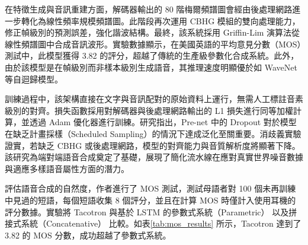 在特徵生成與音訊重建方面，解碼器輸出的 80 階梅爾頻譜圖會經由後處理網路進一步轉化為線性頻率規模頻譜圖。此階段再次運用 CBHG 模組的雙向處理能力，修正幀級別的預測誤差，強化諧波結構。最終，該系統採用 Griffin-Lim 演算法從線性頻譜圖中合成音訊波形。實驗數據顯示，在美國英語的平均意見分數（MOS）測試中，此模型獲得 3.82 的評分，超越了傳統的生產級參數化合成系統。此外，由於該模型是在幀級別而非樣本級別生成語音，其推理速度明顯優於如 WaveNet 等自迴歸模型。

訓練過程中，該架構直接在文字與音訊配對的原始資料上運行，無需人工標註音素級別的對齊。損失函數採用對解碼器與後處理網路輸出的 L1 損失進行同等加權計算，並透過 Adam 優化器進行訓練。研究指出，Pre-net 中的 Dropout 對於模型在缺乏計畫採樣（Scheduled Sampling）的情況下達成泛化至關重要。消歧義實驗證實，若缺乏 CBHG 或後處理網路，模型的對齊能力與音質解析度將顯著下降。該研究為端對端語音合成奠定了基礎，展現了簡化流水線在應對真實世界噪音數據與適應多樣語音屬性方面的潛力。

評估語音合成的自然度，作者進行了 MOS 測試，測試母語者對 100 個未再訓練中見過的短語，每個短語收集 8 個評分，並且在計算 MOS 時僅計入使用耳機的評分數據。實驗將 Tacotron 與基於 LSTM 的參數式系統（Parametric）\cite{zen2016fast} 以及拼接式系統（Concatenative）\cite{gonzalvo2016recent} 比較。如表\ref{tab:mos_results} 所示，Tacotron 達到了 3.82 的 MOS 分數，成功超越了參數式系統。

